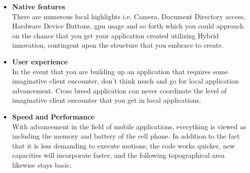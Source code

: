 \begin{itemize}
  \item \textbf{Native features} \\ 
  There are numerous local highlights i.e. Camera, Document Directory access, Hardware Device Buttons, \gls{gpu} usage and so forth which you could approach on the chance that you get your application created utilizing Hybrid innovation, contingent upon the structure that you embrace to create.
  
  \item \textbf{User experience} \\ 
  In the event that you are building up an application that requires some imaginative client encounter, don't think much and go for local application advancement. Cross breed application can never coordinate the level of imaginative client encounter that you get in local applications.
  
  \item \textbf{Speed and Performance} \\
 With advancement in the field of mobile applications, everything is viewed as including the memory and battery of the cell phone. In addition to the fact that it is less demanding to execute motions, the code works quicker, new capacities will incorporate faster, and the following topographical area likewise stays basic.
 
\end{itemize}
